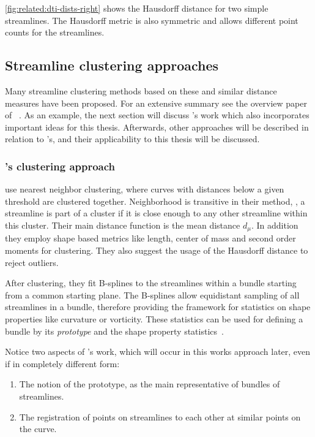 \autoref{fig:related:dti-dists-right} shows the Hausdorff distance for two simple streamlines. The Hausdorff metric is also symmetric and allows different point counts for the streamlines.


\subsection{Streamline clustering approaches}

Many streamline clustering methods based on these and similar distance measures have been proposed. For an extensive summary see the overview paper of ~\cite{Schultz}.
As an example, the next section will discuss 's work which also incorporates important ideas for this thesis.
Afterwards, other approaches will be described in relation to 's, and their applicability to this thesis will be discussed.


\subsubsection{\texorpdfstring{\protect{}}{Corouge et.al.}'s clustering approach} 

 use nearest neighbor clustering, where curves with distances below a given threshold are clustered together. Neighborhood is transitive in their method, \ie, a streamline is part of a cluster if it is close enough to any other streamline within this cluster. Their main distance function is the mean distance $d_\mu$. In addition they employ shape based metrics like length, center of mass and second order moments for clustering. They also suggest the usage of the Hausdorff distance to reject outliers.

After clustering, they fit B-splines to the streamlines within a bundle starting from a common starting plane. The B-splines allow equidistant sampling of all streamlines in a bundle, therefore providing the framework for statistics on shape properties like curvature or vorticity. These statistics can be used for defining a bundle by its \emph{prototype} and the shape property statistics~\cite{Corouge}.

Notice two aspects of 's work, which will occur in this works approach later, even if in completely different form:
%
\begin{enumerate}
	\item The notion of the prototype, as the main representative of bundles of streamlines.
	\item The registration of points on streamlines to each other at similar points on the curve.
\end{enumerate}


